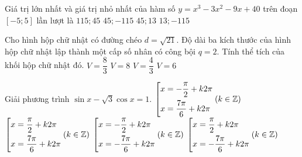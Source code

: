 \begin{ex}%
	Giá trị lớn nhất và giá trị nhỏ nhất của hàm số $ y = x^3 - 3x^2 - 9x + 40 $ trên đoạn $ \left[-5; 5\right] $ lần lượt là 
	\choice
	{$ 115; 45 $}
	{\True $ 45; -115 $}		
	{$ 45; 13 $}		
	{$ 13; -115 $}		
\end{ex}	
\begin{ex}%
	Cho hình hộp chữ nhật có đường chéo $ d = \sqrt{21} $. Độ dài ba kích thước của hình hộp chữ nhật lập thành một cấp số nhân có công bội $ q = 2. $ Tính thể tích của khối hộp chữ nhật đó.
	\choice
	{$ V = \dfrac{8}{3} $}
	{\True $ V = 8 $}		
	{$ V = \dfrac{4}{3} $}		
	{$ V = 6 $}		
\end{ex}	
\begin{ex}%
	Giải phương trình $ \sin x - \sqrt{3} \cos x = 1$.
	\choice
	{$ \left[\begin{aligned}&x = - \dfrac{\pi}{2} + k2 \pi\\ &x = \dfrac{7 \pi}{6}+ k2 \pi\end{aligned}\right. \left( k \in \mathbb{Z}\right)$}
	{\True $ \left[\begin{aligned}&x = \dfrac{\pi}{2} + k2 \pi\\ &x = \dfrac{7 \pi}{6}+ k2 \pi\end{aligned}\right. \left( k \in \mathbb{Z}\right)$}		
	{$ \left[\begin{aligned}&x = -\dfrac{\pi}{2} + k2 \pi\\ &x = -\dfrac{7 \pi}{6}+ k2 \pi\end{aligned}\right. \left( k \in \mathbb{Z}\right)$}		
	{$ \left[\begin{aligned}&x = \dfrac{\pi}{2} + k2 \pi\\ &x = -\dfrac{7 \pi}{6}+ k2 \pi\end{aligned}\right. \left( k \in \mathbb{Z}\right)$}		
\end{ex}	

